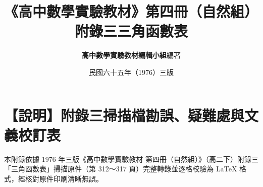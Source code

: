 \documentclass[a4paper,12pt,twoside]{article}
\title{\LARGE\textbf{《高中數學實驗教材》第四冊（自然組）}\\[0.5em] \Large\textbf{附錄三\quad 三角函數表}}
\author{\textbf{高中數學實驗教材編輯小組}\quad 編著}
\date{民國六十五年（1976）三版}
\begin{document}
\maketitle
\thispagestyle{firstpage}

\section*{【說明】附錄三掃描檔勘誤、疑難處與文義校訂表}
\label{sec:errata_notes_b4_a3}

本附錄依據 1976 年三版《高中數學實驗教材 第四冊（自然組）》（高二下）附錄三「三角函數表」掃描原件（第 312～317 頁）完整轉錄並逐格校驗為 \LaTeX{} 格式，經核對原件印刷清晰無誤。

\clearpage
\tableofcontents
\newpage


\end{document}
